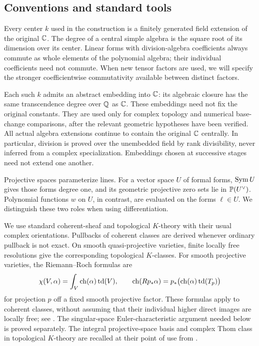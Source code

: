 \FloatBarrier
\subsection{Conventions and standard tools}\label{subsec:conventions}

Every center $k$ used in the construction is a finitely generated field extension of the original $\mathbb C$. The degree of a central simple algebra is the square root of its dimension over its center. Linear forms with division-algebra coefficients always commute as whole elements of the polynomial algebra; their individual coefficients need not commute. When new tensor factors are used, we will specify the stronger coefficientwise commutativity available between distinct factors.

Each such $k$ admits an abstract embedding into $\mathbb C$: its algebraic closure has the same transcendence degree over $\mathbb Q$ as $\mathbb C$. These embeddings need not fix the original constants. They are used only for complex topology and numerical base-change comparisons, after the relevant geometric hypotheses have been verified. All actual algebra extensions continue to contain the original $\mathbb C$ centrally. In particular, division is proved over the unembedded field by rank divisibility, never inferred from a complex specialization. Embeddings chosen at successive stages need not extend one another.

Projective spaces parameterize lines. For a vector space $U$ of formal forms, $\operatorname{Sym} U$ gives those forms degree one, and its geometric projective zero sets lie in $\mathbb P(U^\vee)$. Polynomial functions $w$ on $U$, in contrast, are evaluated on the forms $\ell\in U$. We distinguish these two roles when using differentiation.

We use standard coherent-sheaf and topological $K$-theory with their usual complex orientations. Pullbacks of coherent classes are derived whenever ordinary pullback is not exact. On smooth quasi-projective varieties, finite locally free resolutions give the corresponding topological $K$-classes. For smooth projective varieties, the Riemann--Roch formulas are
\[
 \chi(V,\alpha)=\int_V\operatorname{ch}(\alpha)\operatorname{td}(V),
 \qquad
 \operatorname{ch}(Rp_*\alpha)=p_*\bigl(\operatorname{ch}(\alpha)\operatorname{td}(T_p)\bigr)
\]
for projection $p$ off a fixed smooth projective factor. These formulas apply to coherent classes, without assuming that their individual higher direct images are locally free; see \cite[Sections~4, 6, and~7]{BorelSerre58}. The singular-space Euler-characteristic argument needed below is proved separately. The integral projective-space basis and complex Thom class in topological $K$-theory are recalled at their point of use from \cite{Hatcher}.
